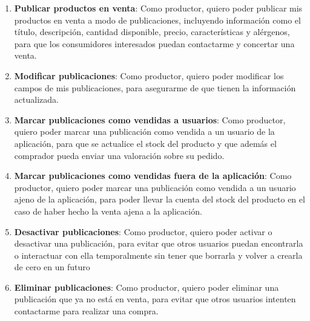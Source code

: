 \begin{enumerate}[label=HU-\protect\twodigits{\arabic*}:, align=left, leftmargin=*]



\item \textbf{Publicar productos en venta}: Como productor, quiero poder publicar mis productos en venta a modo de publicaciones, incluyendo información como el título, descripción, cantidad disponible, precio, características y alérgenos, para que los consumidores interesados puedan contactarme y concertar una venta.

\item \textbf{Modificar publicaciones}: Como productor, quiero poder modificar los campos de mis publicaciones, para asegurarme de que tienen la información actualizada.

\item \textbf{Marcar publicaciones como vendidas a usuarios}: Como productor, quiero poder marcar una publicación como vendida a un usuario de la aplicación, para que se actualice el stock del producto y que además el comprador pueda enviar una valoración sobre su pedido.

\item \textbf{Marcar publicaciones como vendidas fuera de la aplicación}: Como productor, quiero poder marcar una publicación como vendida a un usuario ajeno de la aplicación, para poder llevar la cuenta del stock del producto en el caso de haber hecho la venta ajena a la aplicación.

\item \textbf{Desactivar publicaciones}: Como productor, quiero poder activar o desactivar una publicación, para evitar que otros usuarios puedan encontrarla o interactuar con ella temporalmente sin tener que borrarla y volver a crearla de cero en un futuro

\item \textbf{Eliminar publicaciones}: Como productor, quiero poder eliminar una publicación que ya no está en venta, para evitar que otros usuarios intenten contactarme para realizar una compra.


\end{enumerate}
